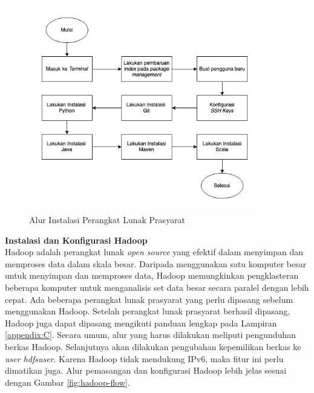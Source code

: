\begin{figure}[h!]
    \centering
    \includegraphics[width=0.9\textwidth]{figures/ch03/prasayarat-flow.png}
    \caption{Alur Instalasi Perangkat Lunak Prasyarat}
    \label{fig:prasyarat-flow}
\end{figure}

\textbf{Instalasi dan Konfigurasi Hadoop}\\
Hadoop adalah perangkat lunak \textit{open source} yang efektif dalam menyimpan dan memproses data dalam skala besar. Daripada menggunakan satu komputer besar untuk menyimpan dan memproses data, Hadoop memungkinkan pengklasteran beberapa komputer untuk menganalisis set data besar secara paralel dengan lebih cepat. Ada beberapa perangkat lunak prasyarat yang perlu dipasang sebelum menggunakan Hadoop. Setelah perangkat lunak prasyarat berhasil dipasang, Hadoop juga dapat dipasang mengikuti panduan lengkap pada Lampiran \ref{appendix:C}. 
Secara umum, alur yang harus dilakukan meliputi pengunduhan berkas Hadoop. Selanjutnya akan dilakukan pengubahan kepemilikan berkas ke \textit{user hdfsuser}. Karena Hadoop tidak mendukung IPv6, maka fitur ini perlu dimatikan juga. Alur pemasangan dan konfigurasi Hadoop lebih jelas sesuai dengan Gambar \ref{fig:hadoop-flow}.\\

